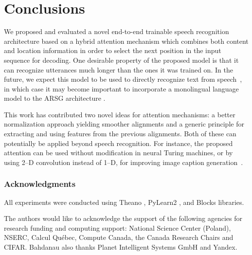 \documentclass{article} %
\begin{document}
\section{Conclusions}

We proposed and evaluated a novel end-to-end trainable speech recognition
architecture based on a hybrid attention mechanism which combines both content
and location information in order to select the next position in the input
sequence for decoding. One desirable property of the proposed model is that it
can recognize utterances much longer than the ones it was trained on. In the
future, we expect this model to be used to directly recognize text from
speech~\cite{hannun2014_deepspeech,graves_2014_towards}, in which case  it may
become important to incorporate a monolingual language model to the ARSG
architecture \cite{gulcehre_2015}.

This work has contributed two novel ideas for attention mechanisms: a better
normalization approach yielding smoother alignments and a generic principle for
extracting and using features from the previous alignments. 
Both of these can potentially be applied beyond speech recognition. For
instance, the proposed attention can be used without
modification in neural Turing machines, or by using 2--D
convolution instead of 1--D, for improving image caption
generation~\cite{xu_show_2015}.


\subsubsection*{Acknowledgments}
All experiments were conducted using Theano
\cite{bergstra+al:2010-scipy,Bastien-Theano-2012}, PyLearn2
\cite{pylearn2_arxiv_2013}, and Blocks
\cite{vanmerrienboer_blocks_2015} libraries.

The authors would like to acknowledge the support of the following agencies for
research funding and computing support: National Science Center (Poland), 
NSERC, Calcul Qu\'{e}bec, Compute Canada,
the Canada Research Chairs and CIFAR. Bahdanau also thanks Planet
Intelligent Systems GmbH and Yandex.


{\small


}

\clearpage
\appendix 

\end{document}
